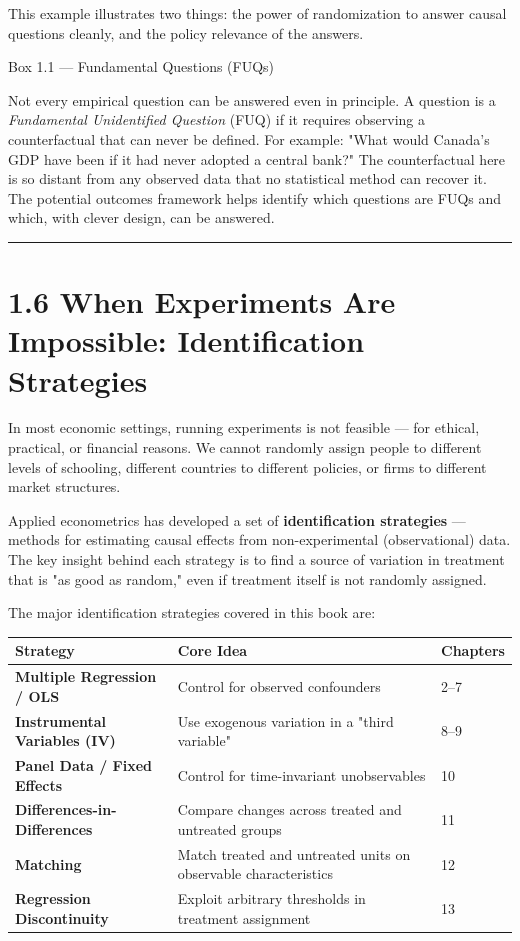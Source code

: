 This example illustrates two things: the power of randomization to answer causal questions cleanly, and the policy relevance of the answers.

\begin{keybox}{Box 1.1 --- Fundamental Questions (FUQs)}

Not every empirical question can be answered even in principle. A question is a \textit{Fundamental Unidentified Question} (FUQ) if it requires observing a counterfactual that can never be defined. For example: "What would Canada's GDP have been if it had never adopted a central bank?" The counterfactual here is so distant from any observed data that no statistical method can recover it. The potential outcomes framework helps identify which questions are FUQs and which, with clever design, can be answered.
\end{keybox}

\medskip\hrule\medskip

\section{1.6 When Experiments Are Impossible: Identification Strategies}

In most economic settings, running experiments is not feasible --- for ethical, practical, or financial reasons. We cannot randomly assign people to different levels of schooling, different countries to different policies, or firms to different market structures.

Applied econometrics has developed a set of \textbf{identification strategies} --- methods for estimating causal effects from non-experimental (observational) data. The key insight behind each strategy is to find a source of variation in treatment that is "as good as random," even if treatment itself is not randomly assigned.

The major identification strategies covered in this book are:

\begin{center}
\begin{tabular}{@{} l l l @{}}
\toprule
\textbf{Strategy} & \textbf{Core Idea} & \textbf{Chapters} \\
\midrule
\textbf{Multiple Regression / OLS} & Control for observed confounders & 2--7 \\
\textbf{Instrumental Variables (IV)} & Use exogenous variation in a "third variable" & 8--9 \\
\textbf{Panel Data / Fixed Effects} & Control for time-invariant unobservables & 10 \\
\textbf{Differences-in-Differences} & Compare changes across treated and untreated groups & 11 \\
\textbf{Matching} & Match treated and untreated units on observable characteristics & 12 \\
\textbf{Regression Discontinuity} & Exploit arbitrary thresholds in treatment assignment & 13 \\
\bottomrule
\end{tabular}
\end{center}

